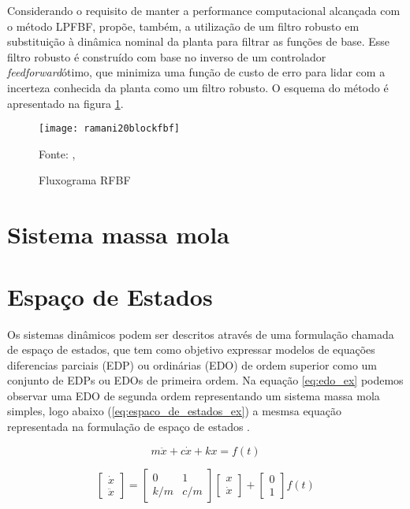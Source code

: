 Considerando o requisito de manter a performance computacional alcançada com o método LPFBF, \cite{ramani20} 
propõe, também, a utilização de um filtro robusto em substituição à dinâmica nominal da planta para 
filtrar as funções de base. Esse filtro robusto é construído com base no inverso de um controlador 
\textit{feedforward}ótimo, que minimiza uma função de custo de erro para lidar com a incerteza conhecida da planta 
como um filtro robusto.
O esquema do método é apresentado na figura \ref{fig:flowchart_rfbf}.

\begin{figure}[H]
    \centering
    \caption{Fluxograma RFBF}
    \texttt{[image: ramani20blockfbf]}

    {\footnotesize Fonte: \citeauthor{ramani20}, \citeyear{ramani20}}
    \label{fig:flowchart_rfbf}
\end{figure}

\section{Sistema massa mola}

\section{Espaço de Estados}

Os sistemas dinâmicos podem ser descritos através de uma formulação
chamada de espaço de estados, que tem como objetivo expressar modelos 
de equações diferencias parciais (EDP) ou ordinárias (EDO) de ordem superior
como um conjunto de EDPs ou EDOs de primeira ordem.
Na equação \ref{eq:edo_ex} podemos observar uma EDO de segunda ordem representando
um sistema massa mola simples,
logo abaixo (\ref{eq:espaco_de_estados_ex}) a mesmsa equação representada na formulação
de espaço de estados \cite{hamilton94}.

\begin{equation}
    \label{eq:edo_ex}
    m \ddot x+c \dot x+kx = f(t)
\end{equation}

\begin{equation}
    \label{eq:espaco_de_estados_ex}
    \begin{bmatrix}
        \dot x \\
        \ddot x
    \end{bmatrix}
    =
    \begin{bmatrix}
        0 & 1 \\
        k/m & c/m
    \end{bmatrix}
    \begin{bmatrix}
        x \\
        \dot x
    \end{bmatrix}
    +
    \begin{bmatrix}
        0 \\
        1
    \end{bmatrix}
    f(t)
\end{equation}

